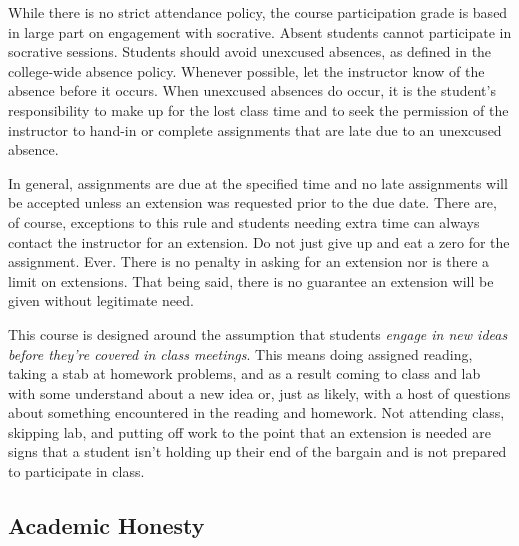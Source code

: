 \documentclass[10pt]{article}
\begin{document}
While there is no strict attendance policy, the course participation grade is based in large part on engagement with socrative. Absent students cannot participate in socrative sessions.  Students should avoid unexcused absences, as defined in the college-wide absence policy. Whenever possible, let the instructor know of the absence before it occurs. When unexcused absences do occur, it is the student's responsibility to make up for the lost class time and to seek the permission of the instructor to hand-in or complete assignments that are late due to an unexcused absence.

In general, assignments are due at the specified time and no late assignments will be accepted unless an extension was requested prior to the due date. There are, of course, exceptions to this rule and students needing extra time can always contact the instructor for an extension. Do not just give up and eat a zero for the assignment. Ever. There is no penalty in asking for an extension nor is there a limit on extensions.  That being said, there is no guarantee an extension will be given without legitimate need.

This course is designed around the assumption that students \textit{engage in new ideas before they're covered in class meetings}.  This means doing assigned reading, taking a stab at homework problems, and as a result coming to class and lab with some understand about a new idea or, just as likely, with a host of questions about something encountered in the reading and homework. Not attending class, skipping lab, and putting off work to the point that an extension is needed are signs that a student isn't holding up their end of the bargain and is not prepared to participate in class.

\subsection{Academic Honesty}
\end{document}
